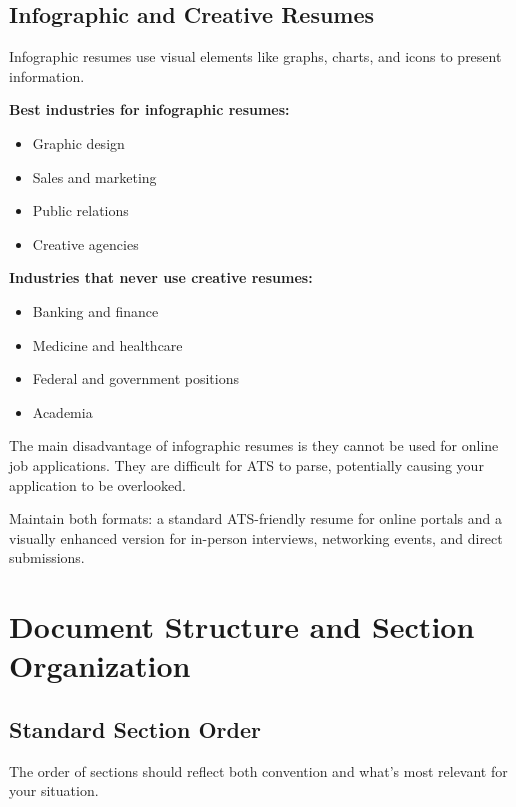 \documentclass[11pt,a4paper]{article}
\begin{document}
\subsection{Infographic and Creative Resumes}

Infographic resumes use visual elements like graphs, charts, and icons to present information.

\textbf{Best industries for infographic resumes:}
\begin{itemize}
    \item Graphic design
    \item Sales and marketing
    \item Public relations
    \item Creative agencies
\end{itemize}

\textbf{Industries that never use creative resumes:}
\begin{itemize}
    \item Banking and finance
    \item Medicine and healthcare
    \item Federal and government positions
    \item Academia
\end{itemize}

\begin{warning}
The main disadvantage of infographic resumes is they cannot be used for online job applications. They are difficult for ATS to parse, potentially causing your application to be overlooked.
\end{warning}

\begin{bestpractice}
Maintain both formats: a standard ATS-friendly resume for online portals and a visually enhanced version for in-person interviews, networking events, and direct submissions.
\end{bestpractice}

\section{Document Structure and Section Organization}

\subsection{Standard Section Order}

The order of sections should reflect both convention and what's most relevant for your situation.
\end{document}
